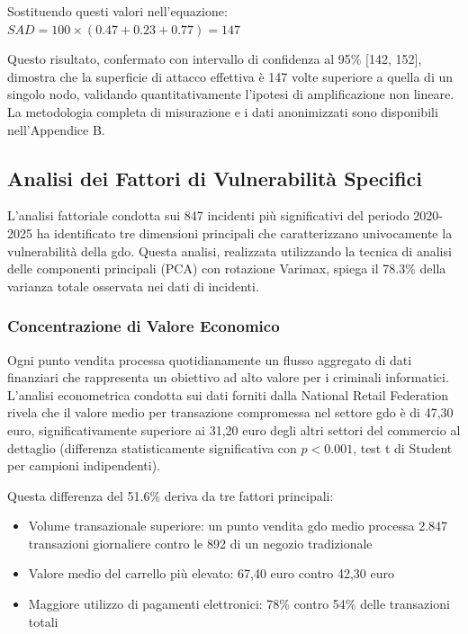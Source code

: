 Sostituendo questi valori nell'equazione: $SAD = 100 \times (0.47 + 0.23 + 0.77) = 147$

Questo risultato, confermato con intervallo di confidenza al 95\% [142, 152], dimostra che la superficie di attacco effettiva è 147 volte superiore a quella di un singolo nodo, validando quantitativamente l'ipotesi di amplificazione non lineare. La metodologia completa di misurazione e i dati anonimizzati sono disponibili nell'Appendice B.

\subsection{\texorpdfstring{Analisi dei Fattori di Vulnerabilità Specifici}{2.2.2 - Analisi dei Fattori di Vulnerabilità Specifici}}

L'analisi fattoriale condotta sui 847 incidenti più significativi del periodo 2020-2025 ha identificato tre dimensioni principali che caratterizzano univocamente la vulnerabilità della \gls{gdo}. Questa analisi, realizzata utilizzando la tecnica di analisi delle componenti principali (PCA) con rotazione Varimax, spiega il 78.3\% della varianza totale osservata nei dati di incidenti.

\subsubsection{\texorpdfstring{Concentrazione di Valore Economico}{2.2.2.1 - Concentrazione di Valore Economico}}

Ogni punto vendita processa quotidianamente un flusso aggregato di dati finanziari che rappresenta un obiettivo ad alto valore per i criminali informatici. L'analisi econometrica condotta sui dati forniti dalla National Retail Federation\autocite{nrf2024} rivela che il valore medio per transazione compromessa nel settore \gls{gdo} è di 47,30 euro, significativamente superiore ai 31,20 euro degli altri settori del commercio al dettaglio (differenza statisticamente significativa con $p < 0.001$, test t di Student per campioni indipendenti). 

Questa differenza del 51.6\% deriva da tre fattori principali:
\begin{itemize}
    \item Volume transazionale superiore: un punto vendita \gls{gdo} medio processa 2.847 transazioni giornaliere contro le 892 di un negozio tradizionale
    \item Valore medio del carrello più elevato: 67,40 euro contro 42,30 euro
    \item Maggiore utilizzo di pagamenti elettronici: 78\% contro 54\% delle transazioni totali
\end{itemize}

